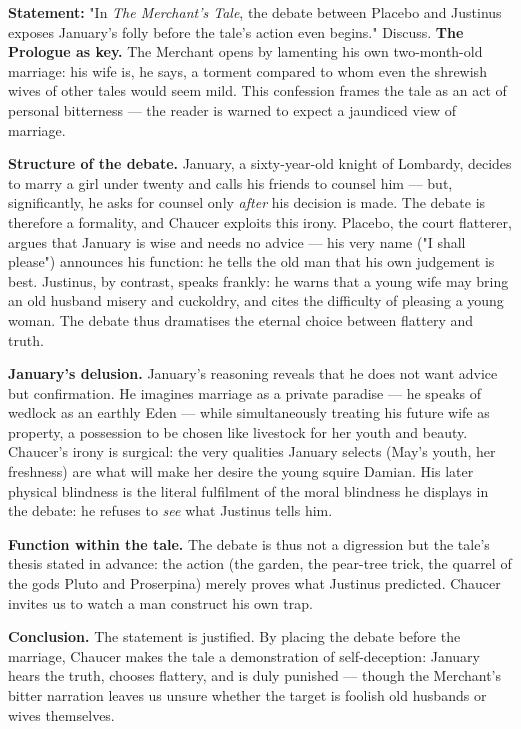 \documentclass[11pt]{article}
\newcommand{\cle}[1]{{\popxbold\color{popdark}#1}}
\begin{document}
\begin{exoresolu}
\textbf{Statement:} "In \emph{The Merchant's Tale}, the debate between Placebo and Justinus exposes January's folly before the tale's action even begins." Discuss.
\tcblower
\textbf{The Prologue as key.} The Merchant opens by lamenting his own two-month-old marriage: his wife is, he says, a torment compared to whom even the shrewish wives of other tales would seem mild. This confession frames the tale as an act of personal bitterness — the reader is warned to expect a jaundiced view of marriage.

\textbf{Structure of the debate.} January, a sixty-year-old knight of Lombardy, decides to marry a girl under twenty and calls his friends to counsel him — but, significantly, he asks for counsel only \emph{after} his decision is made. The debate is therefore a formality, and Chaucer exploits this irony. Placebo, the court flatterer, argues that January is wise and needs no advice — his very name ("I shall please") announces his function: he tells the old man that his own judgement is best. Justinus, by contrast, speaks frankly: he warns that a young wife may bring an old husband misery and cuckoldry, and cites the difficulty of pleasing a young woman. The debate thus dramatises the eternal choice between \cle{flattery} and \cle{truth}.

\textbf{January's delusion.} January's reasoning reveals that he does not want advice but confirmation. He imagines marriage as a private paradise — he speaks of wedlock as an earthly Eden — while simultaneously treating his future wife as property, a possession to be chosen like livestock for her youth and beauty. Chaucer's irony is surgical: the very qualities January selects (May's youth, her freshness) are what will make her desire the young squire Damian. His later physical blindness is the literal fulfilment of the moral blindness he displays in the debate: he refuses to \emph{see} what Justinus tells him.

\textbf{Function within the tale.} The debate is thus not a digression but the tale's thesis stated in advance: the action (the garden, the pear-tree trick, the quarrel of the gods Pluto and Proserpina) merely proves what Justinus predicted. Chaucer invites us to watch a man construct his own trap.

\textbf{Conclusion.} The statement is justified. By placing the debate before the marriage, Chaucer makes the tale a demonstration of self-deception: January hears the truth, chooses flattery, and is duly punished — though the Merchant's bitter narration leaves us unsure whether the target is foolish old husbands or wives themselves.
\end{exoresolu}
\end{document}
